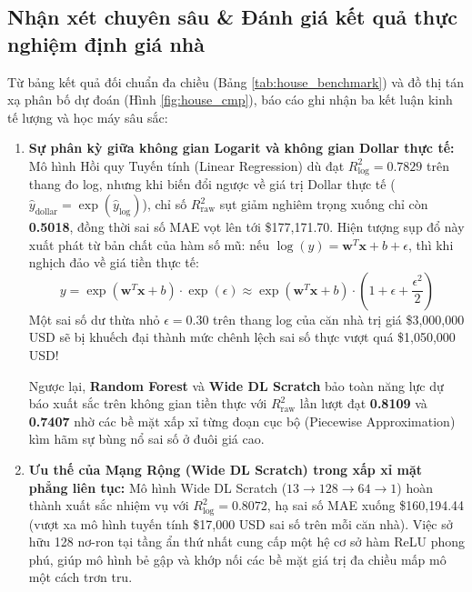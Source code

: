 \documentclass[12pt,a4paper]{report}
\begin{document}
\subsection{Nhận xét chuyên sâu \& Đánh giá kết quả thực nghiệm định giá nhà}
Từ bảng kết quả đối chuẩn đa chiều (Bảng \ref{tab:house_benchmark}) và đồ thị tán xạ phân bố dự đoán (Hình \ref{fig:house_cmp}), báo cáo ghi nhận ba kết luận kinh tế lượng và học máy sâu sắc:
\begin{enumerate}
    \item \textbf{Sự phân kỳ giữa không gian Logarit và không gian Dollar thực tế:}
    Mô hình Hồi quy Tuyến tính (Linear Regression) dù đạt $R^2_{\text{log}} = 0.7829$ trên thang đo log, nhưng khi biến đổi ngược về giá trị Dollar thực tế ($\hat{y}_{\text{dollar}} = \exp(\hat{y}_{\text{log}})$), chỉ số $R^2_{\text{raw}}$ sụt giảm nghiêm trọng xuống chỉ còn \textbf{0.5018}, đồng thời sai số MAE vọt lên tới \$177,171.70. Hiện tượng sụp đổ này xuất phát từ bản chất của hàm số mũ: nếu $\log(y) = \mathbf{w}^T \mathbf{x} + b + \epsilon$, thì khi nghịch đảo về giá tiền thực tế:
    \begin{equation}
        y = \exp(\mathbf{w}^T \mathbf{x} + b) \cdot \exp(\epsilon) \approx \exp(\mathbf{w}^T \mathbf{x} + b) \cdot \left( 1 + \epsilon + \frac{\epsilon^2}{2} \right)
    \end{equation}
    Một sai số dư thừa nhỏ $\epsilon = 0.30$ trên thang log của căn nhà trị giá \$3,000,000 USD sẽ bị khuếch đại thành mức chênh lệch sai số thực vượt quá \$1,050,000 USD! 
    
    Ngược lại, \textbf{Random Forest} và \textbf{Wide DL Scratch} bảo toàn năng lực dự báo xuất sắc trên không gian tiền thực với $R^2_{\text{raw}}$ lần lượt đạt \textbf{0.8109} và \textbf{0.7407} nhờ các bề mặt xấp xỉ từng đoạn cục bộ (Piecewise Approximation) kìm hãm sự bùng nổ sai số ở đuôi giá cao.

    \item \textbf{Ưu thế của Mạng Rộng (Wide DL Scratch) trong xấp xỉ mặt phẳng liên tục:}
    Mô hình Wide DL Scratch ($13 \to 128 \to 64 \to 1$) hoàn thành xuất sắc nhiệm vụ với $R^2_{\text{log}} = 0.8072$, hạ sai số MAE xuống \$160,194.44 (vượt xa mô hình tuyến tính \$17,000 USD sai số trên mỗi căn nhà). Việc sở hữu 128 nơ-ron tại tầng ẩn thứ nhất cung cấp một hệ cơ sở hàm ReLU phong phú, giúp mô hình bẻ gập và khớp nối các bề mặt giá trị đa chiều mấp mô một cách trơn tru.


\end{enumerate}
\end{document}
